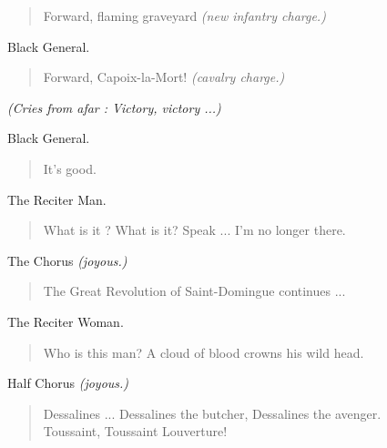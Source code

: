 \documentclass[letterpaper,article,12pt,oneside,notitlepage]{memoir}
\begin{document}
\begin{verse}
Forward, flaming graveyard \textit{(new infantry charge.)} \\
\end{verse}

\begin{center}Black General.\end{center}

\begin{verse}
Forward, Capoix-la-Mort! \textit{(cavalry charge.)} \\
\end{verse}

\textit{(Cries from afar : Victory, victory ...)}

\begin{center}Black General.\end{center}

\begin{verse}
It's good. \\
\end{verse}

\begin{center}The Reciter Man.\end{center}

\begin{verse}
\hspace{1cm} What is it ? What is it? Speak ... I'm no longer there. \\
\end{verse}

\begin{center}The Chorus \textit{(joyous.)}\end{center}

\begin{verse}
The Great Revolution of Saint-Domingue continues ... \\
\end{verse}

\begin{center}The Reciter Woman.\end{center}

\begin{verse}
Who is this man? A cloud of blood crowns his wild head. \\
\end{verse}

\begin{center}Half Chorus \textit{(joyous.)}\end{center}

\begin{verse}
Dessalines ... Dessalines the butcher, Dessalines the avenger. \\
Toussaint, Toussaint Louverture! \\
\end{verse}
\end{document}
